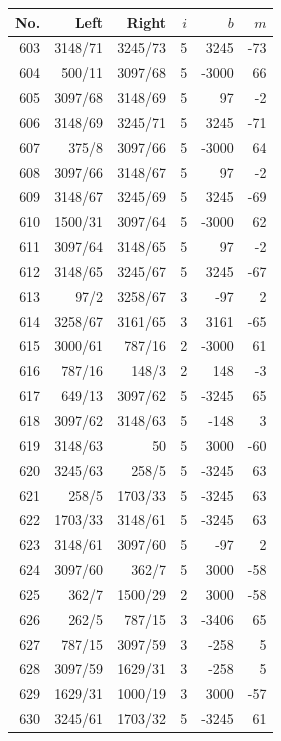 \documentclass[11pt,a4paper]{article}
\begin{document}
\noindent\begin{minipage}[t]{.49\linewidth}\centering\footnotesize\setlength{\tabcolsep}{2pt}\renewcommand{\arraystretch}{1.09}
\begin{tabular*}{\linewidth}{@{}r@{\extracolsep{\fill}}rrrrr@{}}\toprule
No. & Left & Right & $i$ & $b$ & $m$\\\midrule
603 & 3148/71 & 3245/73 & 5 & 3245 & -73\\
604 & 500/11 & 3097/68 & 5 & -3000 & 66\\
605 & 3097/68 & 3148/69 & 5 & 97 & -2\\
606 & 3148/69 & 3245/71 & 5 & 3245 & -71\\
607 & 375/8 & 3097/66 & 5 & -3000 & 64\\
608 & 3097/66 & 3148/67 & 5 & 97 & -2\\
609 & 3148/67 & 3245/69 & 5 & 3245 & -69\\
610 & 1500/31 & 3097/64 & 5 & -3000 & 62\\
611 & 3097/64 & 3148/65 & 5 & 97 & -2\\
612 & 3148/65 & 3245/67 & 5 & 3245 & -67\\
613 & 97/2 & 3258/67 & 3 & -97 & 2\\
614 & 3258/67 & 3161/65 & 3 & 3161 & -65\\
615 & 3000/61 & 787/16 & 2 & -3000 & 61\\
616 & 787/16 & 148/3 & 2 & 148 & -3\\
617 & 649/13 & 3097/62 & 5 & -3245 & 65\\
618 & 3097/62 & 3148/63 & 5 & -148 & 3\\
619 & 3148/63 & 50 & 5 & 3000 & -60\\
620 & 3245/63 & 258/5 & 5 & -3245 & 63\\
621 & 258/5 & 1703/33 & 5 & -3245 & 63\\
622 & 1703/33 & 3148/61 & 5 & -3245 & 63\\
623 & 3148/61 & 3097/60 & 5 & -97 & 2\\
624 & 3097/60 & 362/7 & 5 & 3000 & -58\\
625 & 362/7 & 1500/29 & 2 & 3000 & -58\\
626 & 262/5 & 787/15 & 3 & -3406 & 65\\
627 & 787/15 & 3097/59 & 3 & -258 & 5\\
628 & 3097/59 & 1629/31 & 3 & -258 & 5\\
629 & 1629/31 & 1000/19 & 3 & 3000 & -57\\
630 & 3245/61 & 1703/32 & 5 & -3245 & 61\\

\end{tabular*}
\end{minipage}
\end{document}

